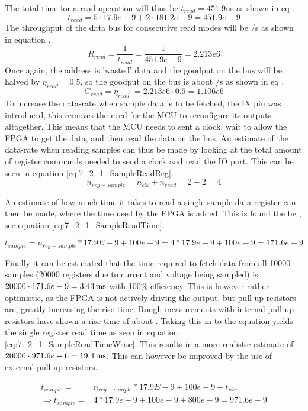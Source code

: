 The total time for a read operation will thus be $t_{read} = 451.9$ns as shown in eq .
\begin{equation}\label{eq:7_2_1_Read_Register2}
    t_{read} = 5\cdot 17.9e-9 + 2\cdot 181.2e-9 = 451.9e-9 
\end{equation}
The throughput of the data bus for consecutive read modes will be /s as shown in equation .
\begin{equation}\label{eq:7_2_1_Read_Throughput}
    R_{read} = \frac{1}{t_{read}} =\frac{1}{451.9e-9} = 2.213e6  
\end{equation}
Once again, the address is 'wasted' data and the goodput on the bus will be halved by $\eta_{read} = 0.5$, so the goodput on the bus is about /s as shown in eq .
\begin{equation}\label{eq:7_2_1_Read_Goodput}
    G_{read} = \eta_{read} \cdot  = 2.213e6\cdot 0.5  = 1.106e6 
\end{equation}
To increase the data-rate when sample data is to be fetched, the IX pin was introduced, this removes the need for the MCU to reconfigure its outputs altogether. This means that the MCU needs to sent a clock, wait  to allow the FPGA to get the data, and then read the data on the bus. An estimate of the data-rate when reading samples can thus be made by looking at the total amount of register commands needed to send a clock and read the IO port. This can be seen in equation \ref{eq:7_2_1_SampleReadReg}.
\begin{equation}\label{eq:7_2_1_SampleReadReg}
    n_{reg-sample} = n_{clk}+n_{read} = 2+2 = 4
\end{equation}

An estimate of how much time it takes to read a single sample data register can then be made, where the  time used by the FPGA is added. This is found the be , see equation \ref{eq:7_2_1_SampleReadTime}.

\begin{equation}\label{eq:7_2_1_SampleReadTime}
    t_{sample} = n_{reg-sample}*17.9E-9 + 100e-9 = 4*17.9e-9+100e-9 = 171.6e-9
\end{equation}

Finally it can be estimated that the time required to fetch data from all 10000 samples (20000 registers due to current and voltage being sampled) is $20000\cdot171.6e-9 = \SI{3.43}{\milli\second}$ with 100\% efficiency. This is however rather optimistic, as the FPGA is not actively driving the output, but pull-up resistors are, greatly increasing the rise time. Rough measurements with internal pull-up resistors have shown a rise time of about . Taking this in to the equation yields the single register read time as seen in equation \ref{eq:7_2_1_SampleReadTimeWrise}. This results in a more realistic estimate of $20000\cdot 971.6e-6 = \SI{19.4}{\milli\second}$. This can however be improved by the use of external pull-up resistors.

\begin{equation}\label{eq:7_2_1_SampleReadTimeWrise}
    \begin{split}
        t_{sample} = &n_{reg-sample}*17.9E-9 + 100e-9+t_{rise} \\
        \Rightarrow t_{sample} = &4*17.9e-9+100e-9+800e-9 = 971.6e-9
    \end{split}
\end{equation}
